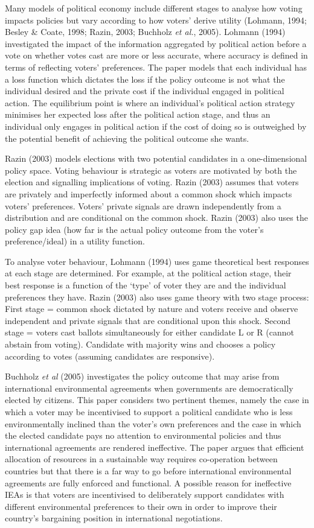 \documentclass[11pt,preprint, authoryear]{elsarticle}
\numberwithin{equation}{section}
\numberwithin{figure}{section}
\numberwithin{table}{section}
\begin{document}
Many models of political economy include different stages to analyse how
voting impacts policies but vary according to how voters' derive utility
(Lohmann, 1994; Besley \& Coate, 1998; Razin, 2003; Buchholz \emph{et
al.}, 2005). Lohmann (1994) investigated the impact of the information
aggregated by political action before a vote on whether votes cast are
more or less accurate, where accuracy is defined in terms of reflecting
voters' preferences. The paper models that each individual has a loss
function which dictates the loss if the policy outcome is not what the
individual desired and the private cost if the individual engaged in
political action. The equilibrium point is where an individual's
political action strategy minimises her expected loss after the
political action stage, and thus an individual only engages in political
action if the cost of doing so is outweighed by the potential benefit of
achieving the political outcome she wants.

Razin (2003) models elections with two potential candidates in a
one-dimensional policy space. Voting behaviour is strategic as voters
are motivated by both the election and signalling implications of
voting. Razin (2003) assumes that voters are privately and imperfectly
informed about a common shock which impacts voters' preferences. Voters'
private signals are drawn independently from a distribution and are
conditional on the common shock. Razin (2003) also uses the policy gap
idea (how far is the actual policy outcome from the voter's
preference/ideal) in a utility function.

To analyse voter behaviour, Lohmann (1994) uses game theoretical best
responses at each stage are determined. For example, at the political
action stage, their best response is a function of the `type' of voter
they are and the individual preferences they have. Razin (2003) also
uses game theory with two stage process: First stage = common shock
dictated by nature and voters receive and observe independent and
private signals that are conditional upon this shock. Second stage =
voters cast ballots simultaneously for either candidate L or R (cannot
abstain from voting). Candidate with majority wins and chooses a policy
according to votes (assuming candidates are responsive).

Buchholz \emph{et al} (2005) investigates the policy outcome that may
arise from international environmental agreements when governments are
democratically elected by citizens. This paper considers two pertinent
themes, namely the case in which a voter may be incentivised to support
a political candidate who is less environmentally inclined than the
voter's own preferences and the case in which the elected candidate pays
no attention to environmental policies and thus international agreements
are rendered ineffective. The paper argues that efficient allocation of
resources in a sustainable way requires co-operation between countries
but that there is a far way to go before international environmental
agreements are fully enforced and functional. A possible reason for
ineffective IEAs is that voters are incentivised to deliberately support
candidates with different environmental preferences to their own in
order to improve their country's bargaining position in international
negotiations.
\end{document}
